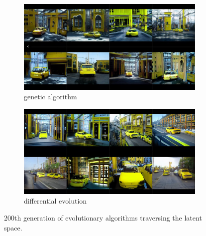 \documentclass[12pt,a4paper,openany]{book}
\begin{document}
\begin{figure}[H]
\centering
\begin{subfigure}[b]{1.0\textwidth}
   \includegraphics[width=1\linewidth]{GA_yellowcar_200.PNG}
   \caption{genetic algorithm}
   \label{fig:Ng1} 
\end{subfigure}

\begin{subfigure}[b]{1.0\textwidth}
   \includegraphics[width=1\linewidth]{DE_yellowcar_200.PNG}
   \caption{differential evolution}
   \label{fig:Ng2}
\end{subfigure}

\caption[Two numerical solutions]{200th generation of evolutionary algorithms traversing the latent space.}
\end{figure}
\end{document}
